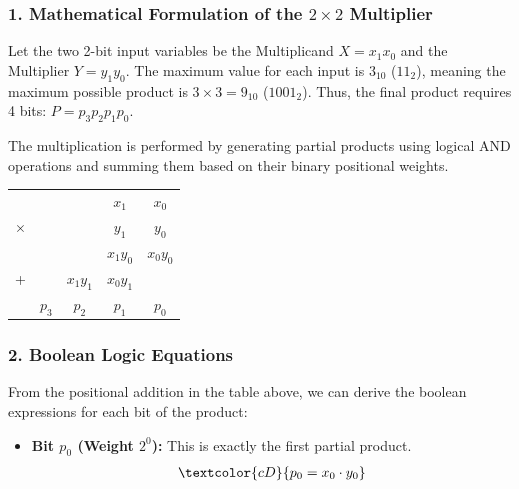 \documentclass[12pt,a3paper]{article}
\begin{document}
\begin{enumerate}
\begin{center}
\begin{tikzpicture}
    \end{tikzpicture}
\end{center}

\begin{tcolorbox}[enhanced,breakable,ansbox,colback=cD!4,colframe=cD,boxrule=0.8pt,arc=5pt,title={\textbf{Answer}},fonttitle=\bfseries\color{white},colbacktitle=cD]

\subsubsection*{1. Mathematical Formulation of the $2 \times 2$ Multiplier}

Let the two 2-bit input variables be the Multiplicand $X = x_1 x_0$ and the Multiplier $Y = y_1 y_0$. The maximum value for each input is $3_{10}$ ($11_2$), meaning the maximum possible product is $3 \times 3 = 9_{10}$ ($1001_2$). Thus, the final product requires 4 bits: $P = p_3 p_2 p_1 p_0$.

The multiplication is performed by generating partial products using logical AND operations and summing them based on their binary positional weights.

\begin{center}
\renewcommand{\arraystretch}{1.2}
\begin{tabular}{ccccc}
  &   &   & $x_1$ & $x_0$ \\
$\times$ &   &   & $y_1$ & $y_0$ \\
\toprule
  &   &   & $x_1 y_0$ & $x_0 y_0$  \\
+ &   & $x_1 y_1$ & $x_0 y_1$ &   \\
\midrule
  & $p_3$ & $p_2$ & $p_1$ & $p_0$ \\
\bottomrule
\end{tabular}
\end{center}

\subsubsection*{2. Boolean Logic Equations}

From the positional addition in the table above, we can derive the boolean expressions for each bit of the product:

\begin{itemize}
    \item \textbf{Bit $p_0$ (Weight $2^0$):} This is exactly the first partial product.
    \begin{align*}
        \textcolor{cD}{p_0 = x_0 \cdot y_0}
    \end{align*}
    

\end{itemize}
\end{tcolorbox}
\end{enumerate}
\end{document}
